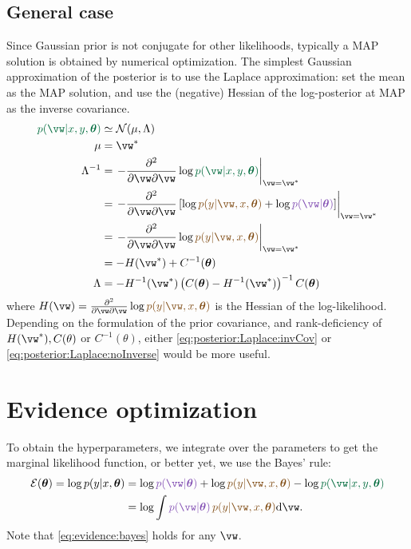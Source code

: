 \documentclass{article}
\newcounter{ct}
\newcommand{\inv}{^{-1}}
\newcommand{\Gaussian}{\ensuremath{\mathcal{N}}} %
\newcommand{\weight}{\vw}
\newcommand{\hyp}{\bm{\theta}}
\newcommand{\likelihood}{\ensuremath{\textcolor{goldenbrown}{p(y|\weight,x,\hyp)}}}
\newcommand{\prior}{\ensuremath{\textcolor{amethyst}{p(\weight|\hyp)}}}
\newcommand{\posterior}{\textcolor{cadmiumgreen}{p(\weight|x,y,\hyp)}}
\begin{document}
\subsection{General case}
Since Gaussian prior is not conjugate for other likelihoods, typically a MAP solution is obtained by numerical optimization.
The simplest Gaussian approximation of the posterior is to use the Laplace approximation: set the mean as the MAP solution, and use the (negative) Hessian of the log-posterior at MAP as the inverse covariance.
\begin{align}
    \posterior &\simeq \Gaussian(\mu, \Lambda)
    \label{eq:posterior:Laplace}
    \\
    \mu &= \weight^\ast
    \\
    \Lambda\inv &= 
	\left.
	-\frac{\partial^2}{\partial \weight \partial \weight}
	\log \posterior \right\vert_{\weight = \weight^\ast}
	\\
	&=
	\left.
	-\frac{\partial^2}{\partial \weight \partial \weight}
	\left[ \log\likelihood + \log\prior \right]
	\right\vert_{\weight = \weight^\ast}
	\\
	&=
	\left.
	-\frac{\partial^2}{\partial \weight \partial \weight}
	\log\likelihood
	\right\vert_{\weight = \weight^\ast}
	\\
	&=
	- H(\weight^\ast)
	+ C\inv(\hyp)
	\label{eq:posterior:Laplace:invCov}
	\\
    \Lambda &=
	- H\inv(\weight^\ast)
	\left(
	    C(\hyp)
	    - H\inv (\weight^\ast)
	\right)\inv
	C(\hyp)
	\label{eq:posterior:Laplace:noInverse}
\end{align}
where 
$ H(\weight) = 
    \frac{\partial^2}{\partial \weight \partial \weight}
    \log\likelihood$ is the Hessian of the log-likelihood.
Depending on the formulation of the prior covariance, and rank-deficiency of $H(\weight^\ast), C(\theta)$ or $C\inv(\theta)$, either \eqref{eq:posterior:Laplace:invCov} or \eqref{eq:posterior:Laplace:noInverse} would be more useful.

\section{Evidence optimization}
To obtain the hyperparameters, we integrate over the parameters to get the marginal likelihood function, or better yet, we use the Bayes' rule:
\begin{align}
    \mathcal{E}(\hyp) = \log p(y|x,\hyp)
	&= \log\prior + \log\likelihood - \log\posterior 
	\label{eq:evidence:bayes}
	\\
	&= \log \int \prior\,\likelihood \mathrm{d}\weight.
	\label{eq:evidence:marginal}
\end{align}
Note that \eqref{eq:evidence:bayes} holds for any $\weight$.
\end{document}
